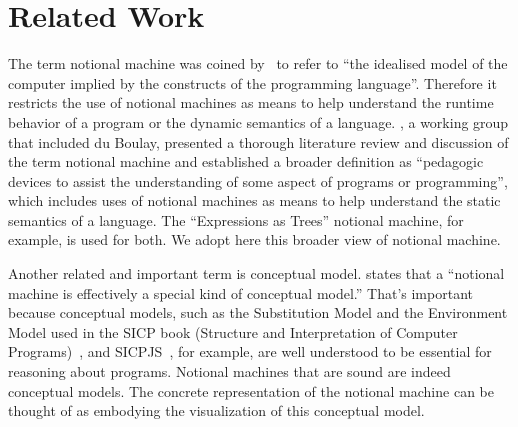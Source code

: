 
\section{Related Work}
\label{sec:RelatedWork}


The term notional machine
was coined by~\citet{duboulayDifficultiesLearningProgram1986} to refer to
``the idealised model of the computer implied by the constructs of the programming language''.
Therefore it
restricts the use of notional machines as means to help understand the runtime behavior of a program or the dynamic semantics of a language.
\citet{fincherNotionalMachinesComputing2020}, a working group that included du Boulay,
presented a thorough literature review and discussion of the term notional machine
and
established a broader definition
as
``pedagogic devices to assist the understanding of some aspect of programs or programming'',
which includes
uses of notional machines as means to help understand the static semantics of a language.
The ``Expressions as Trees'' notional machine,
for example,
is used for both.
We adopt here this broader view of notional machine.

Another related and important term is conceptual model.
\citet{fincherNotionalMachinesComputing2020} states that a
``notional machine is effectively a special kind of conceptual model.''
That's important because
conceptual models,
such as the Substitution Model and the Environment Model used
in the SICP book (Structure and Interpretation of Computer Programs)~\cite{abelsonStructureInterpretationComputer1996},
and SICPJS~\cite{abelsonStructureInterpretationComputer2022},
for example,
are well understood to be essential for reasoning about programs.
Notional machines that are sound are indeed conceptual models.
The concrete representation of the notional machine
can be thought of as embodying the visualization of this conceptual model.


